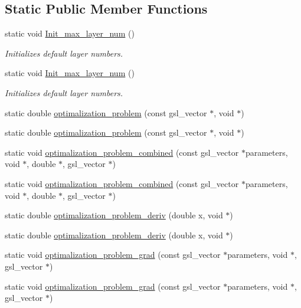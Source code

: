 \subsection*{Static Public Member Functions}
\begin{DoxyCompactItemize}
\item 
static void \hyperlink{class_decomposition___base_a24c7d112a4f3b2346c3d885316f3bfa1}{Init\+\_\+max\+\_\+layer\+\_\+num} ()
\begin{DoxyCompactList}\small\item\em Initializes default layer numbers. \end{DoxyCompactList}\item 
static void \hyperlink{class_decomposition___base_abdb59c6b355a338eb958f58d6f28b966}{Init\+\_\+max\+\_\+layer\+\_\+num} ()
\begin{DoxyCompactList}\small\item\em Initializes default layer numbers. \end{DoxyCompactList}\item 
static double \hyperlink{class_two___qubit___decomposition_a0ec28676a053ce86b6da7306aa9bc411}{optimalization\+\_\+problem} (const gsl\+\_\+vector $\ast$, void $\ast$)
\item 
static double \hyperlink{class_two___qubit___decomposition_a0ec28676a053ce86b6da7306aa9bc411}{optimalization\+\_\+problem} (const gsl\+\_\+vector $\ast$, void $\ast$)
\item 
static void \hyperlink{class_two___qubit___decomposition_a92dd5a03d0b041b402d9f5f9dd657671}{optimalization\+\_\+problem\+\_\+combined} (const gsl\+\_\+vector $\ast$parameters, void $\ast$, double $\ast$, gsl\+\_\+vector $\ast$)
\item 
static void \hyperlink{class_two___qubit___decomposition_a92dd5a03d0b041b402d9f5f9dd657671}{optimalization\+\_\+problem\+\_\+combined} (const gsl\+\_\+vector $\ast$parameters, void $\ast$, double $\ast$, gsl\+\_\+vector $\ast$)
\item 
static double \hyperlink{class_two___qubit___decomposition_ac06d7f1bf56316d1bff952f18581a886}{optimalization\+\_\+problem\+\_\+deriv} (double x, void $\ast$)
\item 
static double \hyperlink{class_two___qubit___decomposition_ac06d7f1bf56316d1bff952f18581a886}{optimalization\+\_\+problem\+\_\+deriv} (double x, void $\ast$)
\item 
static void \hyperlink{class_two___qubit___decomposition_a5f26cb55a63838b483662633630a59f8}{optimalization\+\_\+problem\+\_\+grad} (const gsl\+\_\+vector $\ast$parameters, void $\ast$, gsl\+\_\+vector $\ast$)
\item 
static void \hyperlink{class_two___qubit___decomposition_a5f26cb55a63838b483662633630a59f8}{optimalization\+\_\+problem\+\_\+grad} (const gsl\+\_\+vector $\ast$parameters, void $\ast$, gsl\+\_\+vector $\ast$)
\end{DoxyCompactItemize}
